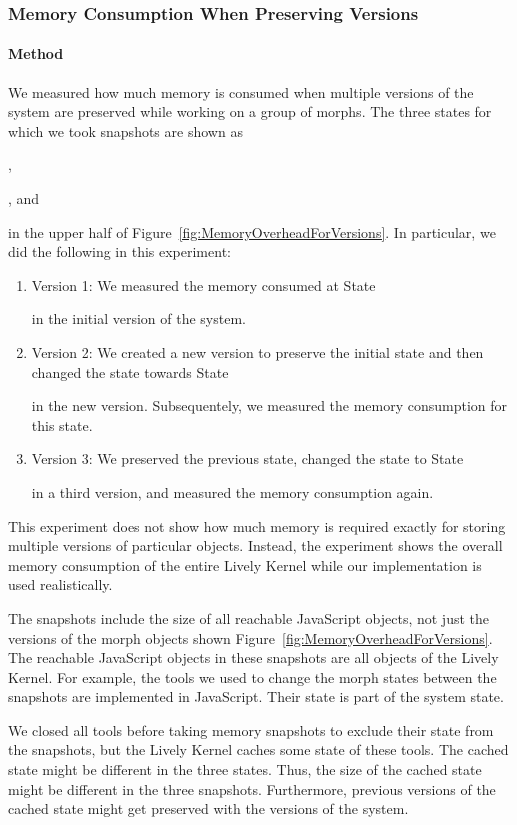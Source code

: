 \documentclass{sigplanconf}
\newcounter{dingdistance}
\newcommand{\circnum}[1]{%
  \addtocounter{dingdistance}{#1}%
  \ding{\value{dingdistance}}%
  \setcounter{dingdistance}{191}}
\begin{document}
\subsubsection{Memory Consumption When Preserving Versions}

\paragraph{Method}
We measured how much memory is consumed when multiple versions of the
system are preserved while working on a group of morphs.  The three
states for which we took snapshots are shown as \circnum{1},
\circnum{2}, and \circnum{3} in the upper half of
Figure~\ref{fig:MemoryOverheadForVersions}.  In particular, we did the
following in this experiment:
\begin{enumerate}
\item Version 1: We measured the memory consumed at State \circnum{1}
  in the initial version of the system.
\item Version 2: We created a new version to preserve the initial
  state and then changed the state towards State \circnum{2} in the
  new version. Subsequentely, we measured the memory consumption for
  this state.
\item Version 3: We preserved the previous state, changed the state to
  State \circnum{3} in a third version, and measured the memory
  consumption again.
\end{enumerate}

This experiment does not show how much memory is required exactly for
storing multiple versions of particular objects.  Instead, the
experiment shows the overall memory consumption of the entire Lively
Kernel while our implementation is used realistically.

The snapshots include the size of all reachable JavaScript objects,
not just the versions of the morph objects shown
Figure~\ref{fig:MemoryOverheadForVersions}.  The reachable JavaScript
objects in these snapshots are all objects of the Lively Kernel.  For
example, the tools we used to change the morph states between the
snapshots are implemented in JavaScript.  Their state is part of the
system state.

We closed all tools before taking memory snapshots to exclude their
state from the snapshots, but the Lively Kernel caches some state of
these tools.  The cached state might be different in the three states.
Thus, the size of the cached state might be different in the three
snapshots.  Furthermore, previous versions of the cached state might
get preserved with the versions of the system.
\end{document}
